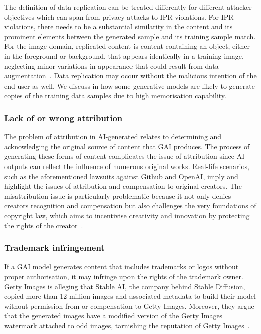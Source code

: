 \documentclass[conference,table]{IEEEtran} %
\begin{document}
The definition of data replication can be treated differently for different attacker objectives which can span from privacy attacks to IPR violations. 
For IPR violations, there needs to be a substantial similarity in the content and its prominent elements between the generated sample and its training sample match.
For the image domain, replicated content is content containing an object, either in the foreground or background, that appears identically in a training image, neglecting minor variations in appearance that could result from data augmentation~\cite{somepalli_diffusion_2022}.
Data replication may occur without the malicious intention of the end-user as well. 
We discuss in  how some generative models are likely to generate copies of the training data samples due to high memorisation capability. 

\subsubsection{Lack of or wrong attribution} 
The problem of attribution in AI-generated relates to determining and acknowledging the original source of content that GAI produces. The process of generating these forms of content complicates the issue of attribution since AI outputs can reflect the influence of numerous original works. 
Real-life scenarios, such as the aforementioned lawsuits against Github and OpenAI, imply and highlight the issues of attribution and compensation to original creators. 
The misattribution issue is particularly problematic because it not only denies creators recognition and compensation but also challenges the very foundations of copyright law, which aims to incentivise creativity and innovation by protecting the rights of the creator~\cite{ulku_kahveci_attribution_2023}.

\subsubsection{Trademark infringement} 
If a GAI model generates content that includes trademarks or logos without proper authorisation, it may infringe upon the rights of the trademark owner. 
Getty Images is alleging that Stable AI, the company behind Stable Diffusion, copied more than 12 million images and associated metadata to build their model without permission from or compensation to Getty Images. 
Moreover, they argue that the generated images have a modified version of the Getty Images watermark attached to odd images, tarnishing the reputation of Getty Images~\cite{vincent_getty_2023}.
    
\end{document}
